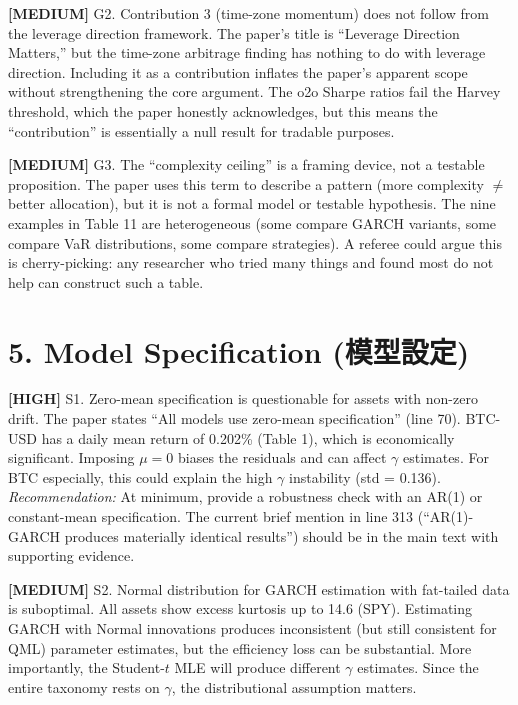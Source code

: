 \documentclass[12pt,a4paper]{article}
\newcommand{\high}[1]{\textcolor{errorred}{\textbf{[HIGH]} #1}}
\newcommand{\med}[1]{\textcolor{warncolor}{\textbf{[MEDIUM]} #1}}
\begin{document}
\med{G2. Contribution 3 (time-zone momentum) does not follow from the leverage direction framework.} The paper's title is ``Leverage Direction Matters,'' but the time-zone arbitrage finding has nothing to do with leverage direction. Including it as a contribution inflates the paper's apparent scope without strengthening the core argument. The o2o Sharpe ratios fail the Harvey threshold, which the paper honestly acknowledges, but this means the ``contribution'' is essentially a null result for tradable purposes.

\med{G3. The ``complexity ceiling'' is a framing device, not a testable proposition.} The paper uses this term to describe a pattern (more complexity $\neq$ better allocation), but it is not a formal model or testable hypothesis. The nine examples in Table 11 are heterogeneous (some compare GARCH variants, some compare VaR distributions, some compare strategies). A referee could argue this is cherry-picking: any researcher who tried many things and found most do not help can construct such a table.


\section*{5. Model Specification (模型設定)}

\high{S1. Zero-mean specification is questionable for assets with non-zero drift.} The paper states ``All models use zero-mean specification'' (line 70). BTC-USD has a daily mean return of 0.202\% (Table 1), which is economically significant. Imposing $\mu = 0$ biases the residuals and can affect $\gamma$ estimates. For BTC especially, this could explain the high $\gamma$ instability (std = 0.136). \emph{Recommendation:} At minimum, provide a robustness check with an AR(1) or constant-mean specification. The current brief mention in line 313 (``AR(1)-GARCH produces materially identical results'') should be in the main text with supporting evidence.

\med{S2. Normal distribution for GARCH estimation with fat-tailed data is suboptimal.} All assets show excess kurtosis up to 14.6 (SPY). Estimating GARCH with Normal innovations produces inconsistent (but still consistent for QML) parameter estimates, but the efficiency loss can be substantial. More importantly, the Student-$t$ MLE will produce different $\gamma$ estimates. Since the entire taxonomy rests on $\gamma$, the distributional assumption matters.
\end{document}
